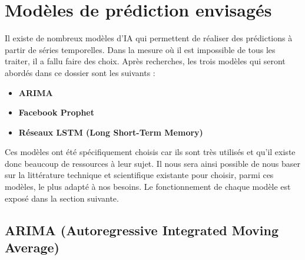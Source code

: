 \documentclass[french]{article}
\begin{document}
    \section{Modèles de prédiction envisagés}

    Il existe de nombreux modèles d'IA qui permettent de réaliser des prédictions à partir de séries temporelles. Dans la mesure où il est impossible de tous les traiter, il a fallu faire des choix. Après recherches, les trois modèles qui seront abordés dans ce dossier sont les suivants :
    \begin{itemize}
        \item \textbf{ARIMA}
        \item \textbf{Facebook Prophet}
        \item \textbf{Réseaux LSTM (Long Short-Term Memory)}
    \end{itemize} 
    
    Ces modèles ont été spécifiquement choisis car ils sont très utilisés et qu'il existe donc beaucoup de ressources à leur sujet. Il nous sera ainsi possible de nous baser sur la littérature technique et scientifique existante pour choisir, parmi ces modèles, le plus adapté à nos besoins. Le fonctionnement de chaque modèle est exposé dans la section suivante.

    \subsection{ARIMA (Autoregressive Integrated Moving Average)}
\end{document}
